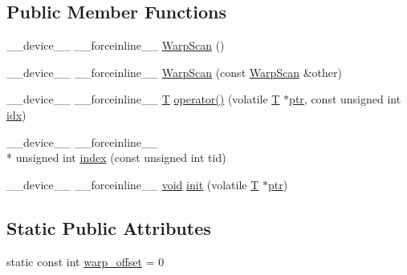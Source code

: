 \subsection*{Public Member Functions}
\begin{DoxyCompactItemize}
\item 
\-\_\-\-\_\-device\-\_\-\-\_\- \-\_\-\-\_\-forceinline\-\_\-\-\_\- \hyperlink{structcv_1_1gpu_1_1device_1_1WarpScan_a5336ad768a94794d2f99632f63334e90}{Warp\-Scan} ()
\item 
\-\_\-\-\_\-device\-\_\-\-\_\- \-\_\-\-\_\-forceinline\-\_\-\-\_\- \hyperlink{structcv_1_1gpu_1_1device_1_1WarpScan_a7aacde3300f427e840b91f0d68c9428f}{Warp\-Scan} (const \hyperlink{structcv_1_1gpu_1_1device_1_1WarpScan}{Warp\-Scan} \&other)
\item 
\-\_\-\-\_\-device\-\_\-\-\_\- \-\_\-\-\_\-forceinline\-\_\-\-\_\- \hyperlink{calib3d_8hpp_a3efb9551a871ddd0463079a808916717}{T} \hyperlink{structcv_1_1gpu_1_1device_1_1WarpScan_ae91d1a85e275ec6b80f0be1f2fcdfbd4}{operator()} (volatile \hyperlink{calib3d_8hpp_a3efb9551a871ddd0463079a808916717}{T} $\ast$\hyperlink{core__c_8h_a166529da793cc1ef241cff347f3db5a5}{ptr}, const unsigned int \hyperlink{core__c_8h_a5c7c842f447336aa2f10826df65a28b3}{idx})
\item 
\-\_\-\-\_\-device\-\_\-\-\_\- \-\_\-\-\_\-forceinline\-\_\-\-\_\- \\*
unsigned int \hyperlink{structcv_1_1gpu_1_1device_1_1WarpScan_a09424224613a80b4e1110e7e4939b7e1}{index} (const unsigned int tid)
\item 
\-\_\-\-\_\-device\-\_\-\-\_\- \-\_\-\-\_\-forceinline\-\_\-\-\_\- \hyperlink{legacy_8hpp_a8bb47f092d473522721002c86c13b94e}{void} \hyperlink{structcv_1_1gpu_1_1device_1_1WarpScan_a2f4c8ea0929ec66d7778c257d488aaa2}{init} (volatile \hyperlink{calib3d_8hpp_a3efb9551a871ddd0463079a808916717}{T} $\ast$\hyperlink{core__c_8h_a166529da793cc1ef241cff347f3db5a5}{ptr})
\end{DoxyCompactItemize}
\subsection*{Static Public Attributes}
\begin{DoxyCompactItemize}
\item 
static const int \hyperlink{structcv_1_1gpu_1_1device_1_1WarpScan_a0978bf5f6f6e675cf51c6dec802b58b7}{warp\-\_\-offset} = 0
\end{DoxyCompactItemize}


